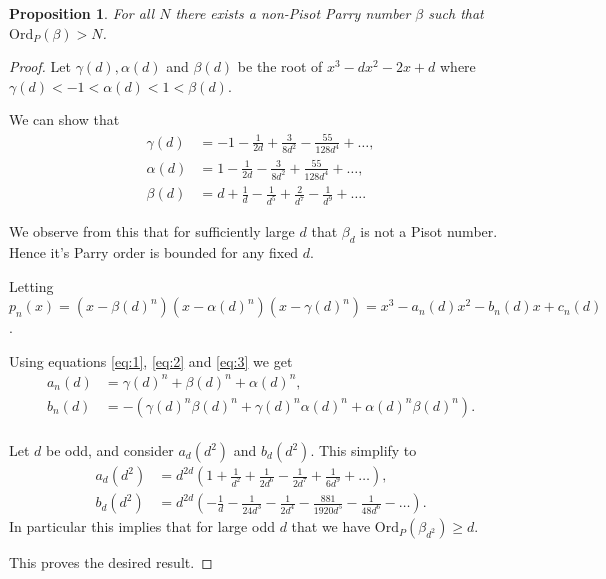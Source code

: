 \documentclass[12pt]{article}
\theoremstyle{plain}
\newtheorem{proposition}[theorem]{Proposition}
\theoremstyle{remark}
\newcommand{\OrdP}{\mathrm{Ord}_{P}}
\begin{document}
\begin{proposition}
    For all $N$ there exists a non-Pisot Parry number $\beta$ such that $\OrdP(\beta) > N$.
\end{proposition}
\begin{proof}
    Let $\gamma(d), \alpha(d)$ and $\beta(d)$ be the root of $x^3-d x^2-2 x + d$ where
    $\gamma(d) < -1 < \alpha(d) < 1 < \beta(d)$.

    We can show that
    \begin{align}
    \gamma(d) & = -1-\frac{1}{2d} + \frac{3}{8 d^2} - \frac{55}{128 d^4} + \dots, \label{eq:1} \\
    \alpha(d) & = 1-\frac{1}{2d} - \frac{3}{8 d^2} + \frac{55}{128 d^4} + \dots, \label{eq:2} \\
    \beta(d) & = d + \frac{1}{d} - \frac{1}{d^5} + \frac{2}{d^7} - \frac{1}{d^9} + \dots.  \label{eq:3}
    \end{align}

    We observe from this that for sufficiently large $d$ that $\beta_d$ is not a Pisot number.  Hence it's Parry order is bounded for any fixed $d$.

    Letting $p_n(x) = (x-\beta(d)^n) (x-\alpha(d)^n) ( x- \gamma(d)^n) = x^3 - a_n(d) x^2 - b_n(d) x + c_n(d)$.

    Using equations \eqref{eq:1}, \eqref{eq:2} and \eqref{eq:3} we get 
    \begin{align*}
        a_n(d) & = 
            \gamma(d)^n + \beta(d)^n + \alpha(d)^n, \\
        b_n(d) & = -(\gamma(d)^n \beta(d)^n + \gamma(d)^n \alpha(d)^n + \alpha(d)^n \beta(d)^n). \\
    \end{align*}

    Let $d$ be odd, and consider $a_d(d^2)$ and $b_d(d^2)$. 
    This simplify to 
    \begin{align*}
        a_d(d^2) & = d^{2d} \left( 1 + \frac{1}{d^2} + \frac{1}{2 d^6} - \frac{1}{2 d^7} + \frac{1}{6 d^9} + \dots \right), \\
        b_d(d^2) & = d^{2d} \left(-\frac{1}{d} - \frac{1}{24 d^3} - \frac{1}{2 d^4} - \frac{881}{1920 d^5} - \frac{1}{48 d^6} - \dots \right).         
    \end{align*}
    In particular this implies that for large odd $d$ that we have $\OrdP(\beta_{d^2}) \geq d$.

This proves the desired result.
\end{proof}
\end{document}
